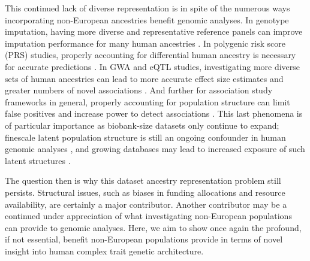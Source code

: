 \documentclass[12pt,a4paper]{article}
\begin{document}
This continued lack of diverse representation is in spite of the numerous ways incorporating non-European ancestries benefit genomic analyses. In genotype imputation, having more diverse and representative reference panels can improve imputation performance for many human ancestries \citep{Huang2009,Howie2011,Das2018,Kowalski2019}. In polygenic risk score (PRS) studies, properly accounting for differential human ancestry is necessary for accurate predictions \citep{Martin2017a,Duncan2019,Kerminen2019,Rosenberg2019,Marnetto2020,Mostafavi2020}. In GWA and eQTL studies, investigating more diverse sets of human ancestries can lead to more accurate effect size estimates and greater numbers of novel associations \citep{Dumitrescu2011,Stranger2012,Carlson2013,Bien2019,Mogil2018,Gurdasani2019,Kuchenbaecker2019,Wojcik2019,Zhong2019}. And further for association study frameworks in general, properly accounting for population structure can limit false positives and increase power to detect associations \citep{Kang2010,Price2010,Zhou2012,Sul2018}. This last phenomena is of particular importance as biobank-size datasets only continue to expand; finescale latent population structure is still an ongoing confounder in human genomic analyses \citep{Berg2019,Sohail2019,Lawson2020}, and growing databases may lead to increased exposure of such latent structures \citep{Haworth2019,Dai2020,Sakaue2020,Lawson2020}. 

The question then is why this dataset ancestry representation problem still persists. Structural issues, such as biases in funding allocations and resource availability, are certainly a major contributor. Another contributor may be a continued under appreciation of what investigating non-European populations can provide to genomic analyses. Here, we aim to show once again the profound, if not essential, benefit non-European populations provide in terms of novel insight into human complex trait genetic architecture.
\end{document}
